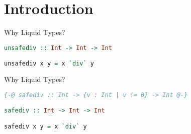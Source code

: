 \section{Introduction}

\begin{frame}[containsverbatim]{Why Liquid Types?}
\begin{lstlisting}[language=Haskell, basicstyle=\small]
unsafediv :: Int -> Int -> Int

unsafediv x y = x `div` y
\end{lstlisting}
\end{frame}

\begin{frame}[containsverbatim]{Why Liquid Types?}
\begin{lstlisting}[language=Haskell, basicstyle=\small]
{-@ safediv :: Int -> {v : Int | v != 0} -> Int @-}

safediv :: Int -> Int -> Int

safediv x y = x `div` y
\end{lstlisting}
\end{frame}